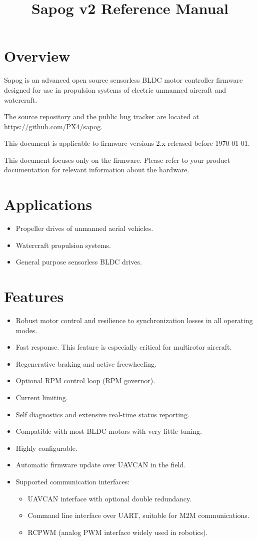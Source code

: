 \documentclass{zubaxdoc}
\title{Sapog v2 Reference Manual}
\begin{document}
\frontmatter

\begin{titlepage}
\section*{Overview}

Sapog is an advanced open source sensorless BLDC motor controller firmware designed for
use in propulsion systems of electric unmanned aircraft and watercraft.

The source repository and the public bug tracker are located at
\url{https://github.com/PX4/sapog}.

This document is applicable to firmware versions 2.x released before \today.

This document focuses only on the firmware.
Please refer to your product documentation for relevant information about the hardware.

\section*{Applications}
\begin{itemize}
    \item Propeller drives of unmanned aerial vehicles.
    \item Watercraft propulsion systems.
    \item General purpose sensorless BLDC drives.
\end{itemize}

\BeginRightColumn
\section*{Features}
\begin{itemize}
    \item Robust motor control and resilience to synchronization losses in all operating modes.
    \item Fast response. This feature is especially critical for multirotor aircraft.
    \item Regenerative braking and active freewheeling.
    \item Optional RPM control loop (RPM governor).
    \item Current limiting.
    \item Self diagnostics and extensive real-time status reporting.
    \item Compatible with most BLDC motors with very little tuning.
    \item Highly configurable.
    \item Automatic firmware update over UAVCAN in the field.
    \item Supported communication interfaces:
    \begin{itemize}
        \item UAVCAN interface with optional double redundancy.
        \item Command line interface over UART, suitable for M2M communications.
        \item RCPWM (analog PWM interface widely used in robotics).
    \end{itemize}
\end{itemize}


\end{titlepage}
\end{document}

